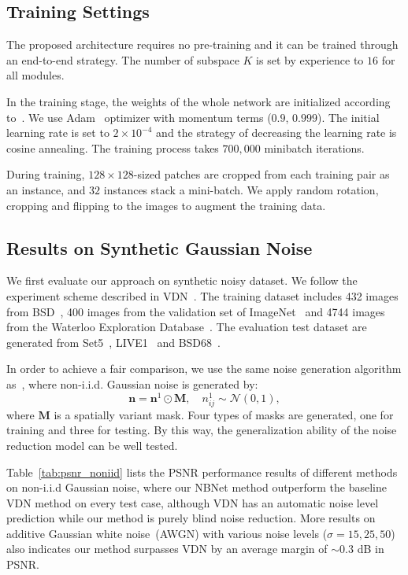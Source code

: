 \documentclass[final]{cvpr}
\newcommand{\bs}{\boldsymbol}
\begin{document}
\subsection{Training Settings}
The proposed architecture requires no pre-training and it can be trained through an end-to-end strategy. The number of subspace $K$ is set by experience to $16$ for all modules.

In the training stage, the weights of the whole network are initialized according to~\cite{he2015delving}. We use Adam~\cite{kingma2014adam} optimizer with momentum terms ($0.9$, $0.999$). The initial learning rate is set to $2\times 10^{-4}$ and the strategy of decreasing the learning rate is cosine annealing. The training process takes $700,000$ minibatch iterations.



During training, $128\times 128$-sized patches are cropped from each training pair as an instance, and
$32$ instances stack a mini-batch. We apply random rotation, cropping and flipping to the images to augment the training data. 


\subsection{Results on Synthetic Gaussian Noise}
We first evaluate our approach on synthetic noisy dataset. We follow the experiment scheme
described in VDN~\cite{yue2019variational}. 
The training dataset includes 432 images from BSD~\cite{arbelaez2010contour}, 400 images from the validation set of ImageNet~\cite{deng2014scalable} and 4744 images from the Waterloo Exploration Database~\cite{ma2016waterloo}.
The evaluation test dataset are generated from Set5~\cite{kim2016accurate}, LIVE1~\cite{kim2016accurate} and BSD68~\cite{amfm_pami2011}.

In order to achieve a fair comparison, we use the same noise generation algorithm as~\cite{yue2019variational}, where non-i.i.d. Gaussian noise is generated by:
\begin{equation}
    \label{eqn:noniid}
    \bs{n}=\bs{n}^{1} \odot \bs{M}, \quad n_{i j}^{1} \sim \mathcal{N}(0,1),
\end{equation}
where $\boldsymbol{M}$ is a spatially variant mask. Four types of masks are generated, one for 
training and three for testing. By this way, the generalization ability of the noise reduction
model can be well tested.


Table~\ref{tab:psnr_noniid} lists the PSNR performance results of different methods on 
non-i.i.d Gaussian noise, where our NBNet method outperform the baseline VDN method on
every test case, although VDN has an automatic noise level prediction while our method
is purely blind noise reduction. More results on additive Gaussian white noise~(AWGN)
with various noise levels ($\sigma=15,25,50$) also indicates our method surpasses VDN
by an average margin of $\sim 0.3$ dB in PSNR.
\end{document}
